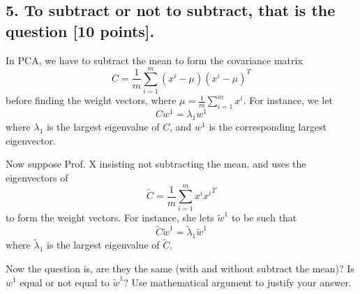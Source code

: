 \documentclass[twoside,10pt]{article}
\begin{document}
\clearpage


\subsection*{5. To subtract or not to subtract, that is the question [10 points].}

In PCA, we have to subtract the mean to form the covariance matrix 
\[
C = \frac 1 m \sum_{i=1}^m (x^i - \mu)(x^i - \mu)^T 
\]
before finding the weight vectors, where $\mu = \frac 1m \sum_{i=1}^m x^i$. For instance, we let
\[
 C w^1= \lambda_1 w^1
\]
where $\lambda_1$ is the largest eigenvalue of $C$, and $w^1$ is the corresponding largest eigenvector.  

Now suppose Prof. X insisting not subtracting the mean, and uses the eigenvectors of 
\[
\tilde C = \frac 1 m \sum_{i=1}^m x^i {x^i}^T
\]
to form the weight vectors. For instance, she lets $\tilde w^1$ to be such that 
\[
\tilde C \tilde w^1 = \tilde \lambda_1 \tilde w^1
\]
where $\tilde \lambda_1$ is the largest eigenvalue of $\tilde C$. 

Now the question is, are they the same (with and without subtract the mean)? Is $w^1$ equal or not equal to $\tilde w^1$? Use mathematical argument to justify your answer.
\end{document}
